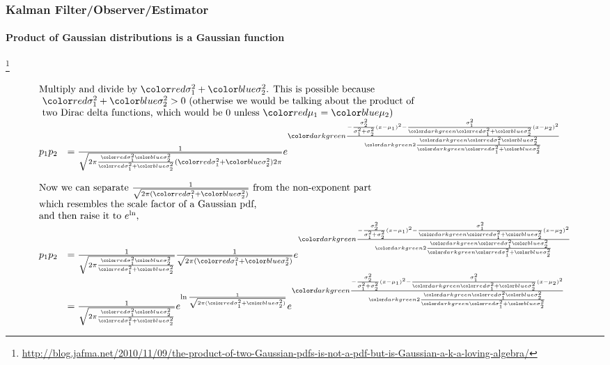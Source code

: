 \documentclass{beamer}
\newenvironment{changemargin}[2]
	{
	  	\begin{list}{}
		{
			\setlength{\topsep}{0pt}%
			\setlength{\leftmargin}{#1}%
			\setlength{\rightmargin}{#2}%
			\setlength{\listparindent}{\parindent}%
			\setlength{\itemindent}{\parindent}%
			\setlength{\parsep}{\parskip}%
		}
	  	\item[]
		}
		{\end{list}
	}
\begin{document}
\begin{frame}
\frametitle{Kalman Filter/Observer/Estimator}
\framesubtitle{Product of Gaussian distributions is a Gaussian function}

\footnote{\tiny\hspace{-0.23in} \hspace{-0.25in}
\href{http://blog.jafma.net/2010/11/09/the-product-of-two-Gaussian-pdfs-is-not-a-pdf-but-is-Gaussian-a-k-a-loving-algebra/}{http://blog.jafma.net/2010/11/09/the-product-of-two-Gaussian-pdfs-is-not-a-pdf-but-is-Gaussian-a-k-a-loving-algebra/}}
\scriptsize

\begin{equation*}
\begin{array}{llllllll}
\multicolumn{2}{l}{\textrm{Multiply and divide by ${ \varone + \vartwo }$.  This is possible because}}\\
\multicolumn{2}{l}{\textrm{ ${ \varone + \vartwo } > 0$ (otherwise we would be talking about the product of}}\\
\multicolumn{2}{l}{\textrm{ two Dirac delta functions, which would be 0 unless $\muone = \mutwo$)}}\\

p_1 p_2 &=    \frac{1}{\sqrt{2 \pi \frac { \varone \vartwo }{\varone + \vartwo} ( \varone + \vartwo ) 2 \pi }}         e^{ \xx}\\\\

\multicolumn{2}{l}{\textrm{Now we can separate $\frac{1}{\sqrt{2 \pi ( \varone + \vartwo ) }}$ from the non-exponent part }}\\
\multicolumn{2}{l}{\textrm{which resembles the scale factor of a Gaussian pdf,}}\\
\multicolumn{2}{l}{\textrm{and then raise it to $e^{\ln}$,}}\\
p_1 p_2 &=    \frac{1}{\sqrt{2 \pi \frac { \varone \vartwo }{\varone + \vartwo} }}     \frac{1}{\sqrt{2 \pi ( \varone + \vartwo ) }}         e^{ \xx}\\

&=\frac{1}{\sqrt{2 \pi \frac { \varone \vartwo }{\varone + \vartwo} }}     e^{ \ln { \frac{1}{\sqrt{2 \pi ( \varone + \vartwo ) }} }  }        e^{ \xx}\\
\end{array}
\end{equation*}
\end{frame}
\end{document}
